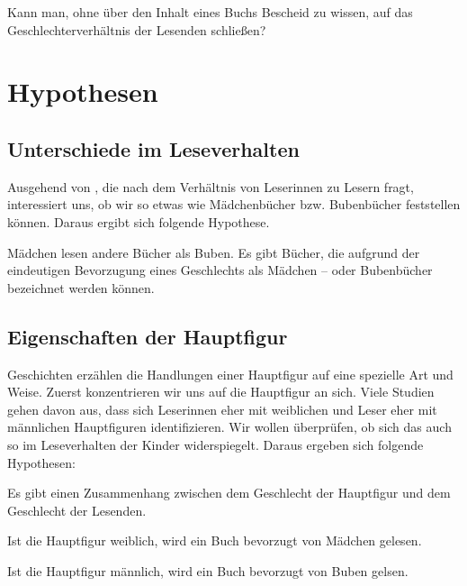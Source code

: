 \begin{frage}\label{fra:merkmale} Kann man, ohne über den Inhalt eines Buchs Bescheid zu wissen, auf das Geschlechterverhältnis der Lesenden schließen? \end{frage}

\section{Hypothesen}

\subsection{Unterschiede im Leseverhalten}

Ausgehend von , die nach dem Verhältnis von Leserinnen
zu Lesern fragt, interessiert uns, ob wir so etwas wie Mädchenbücher
bzw. Bubenbücher feststellen können. Daraus ergibt sich folgende
Hypothese.

\begin{hyp}\label{hyp:andere}
Mädchen lesen andere Bücher als Buben. Es gibt Bücher, die aufgrund der eindeutigen Bevorzugung eines Geschlechts als Mädchen – oder Bubenbücher bezeichnet werden können. \end{hyp}

\subsection{Eigenschaften der Hauptfigur}

Geschichten erzählen die Handlungen einer Hauptfigur auf eine spezielle
Art und Weise. Zuerst konzentrieren wir uns auf die Hauptfigur an sich.
Viele Studien gehen davon aus, dass sich Leserinnen eher mit weiblichen
und Leser eher mit männlichen Hauptfiguren identifizieren. Wir wollen
überprüfen, ob sich das auch so im Leseverhalten der Kinder
widerspiegelt. Daraus ergeben sich folgende Hypothesen:

\begin{hyp}\label{h2} Es gibt einen Zusammenhang zwischen dem Geschlecht der Hauptfigur und dem Geschlecht der Lesenden. \end{hyp}

\begin{subhyp}\label{h2.1} Ist die Hauptfigur weiblich, wird ein Buch bevorzugt von Mädchen gelesen. \end{subhyp}

\begin{subhyp}\label{h2.2} Ist die Hauptfigur männlich, wird ein Buch bevorzugt von Buben gelsen. \end{subhyp}

